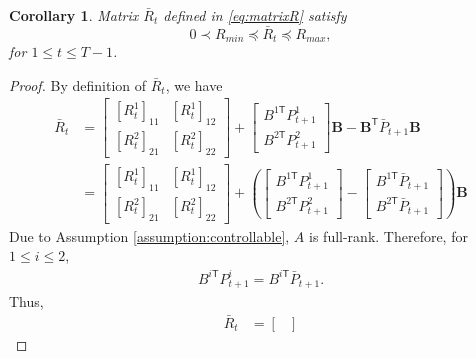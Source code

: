 \documentclass[letterpaper, 10 pt, conference]{ieeeconf}  %
\newcommand{\transpose}{\mathsf{T}}
\newtheorem{corollary}{Corollary}
\begin{document}
\begin{corollary}
    Matrix $\bar{R}_{t}$ defined in \eqref{eq:matrixR} satisfy
    \begin{equation}
        0 \prec R_{min} \preceq \bar{R}_{t} \preceq R_{max},
    \end{equation}
    for $1\leq t \leq T-1$.
\end{corollary}
\begin{proof}
    By definition of $\bar{R}_{t}$, we have
    \begin{align*}
        \bar{R}_{t} &= 
        \begin{bmatrix}
            [R_{t}^{1}]_{11} & [R_{t}^{1}]_{12}\\
            [R_{t}^{2}]_{21} & [R_{t}^{2}]_{22}
        \end{bmatrix}
        + 
        \begin{bmatrix}
            B^{1\transpose}P_{t+1}^{1}\\
            B^{2\transpose}P_{t+1}^{2}
        \end{bmatrix}\mathbf{B}
        - \mathbf{B}^{\transpose}\bar{P}_{t+1}\mathbf{B}\\
        &= \begin{bmatrix}
            [R_{t}^{1}]_{11} & [R_{t}^{1}]_{12}\\
            [R_{t}^{2}]_{21} & [R_{t}^{2}]_{22}
        \end{bmatrix}
        + 
        (\begin{bmatrix}
            B^{1\transpose}P_{t+1}^{1}\\
            B^{2\transpose}P_{t+1}^{2}
        \end{bmatrix}-
        \begin{bmatrix}
            B^{1\transpose}\bar{P}_{t+1}\\
            B^{2\transpose}\bar{P}_{t+1}
        \end{bmatrix}
        )\mathbf{B}
    \end{align*}
    Due to Assumption \ref{assumption:controllable}, $A$ is full-rank. Therefore, for $1\leq i \leq 2$,
    \begin{align*}
        B^{i\transpose}P_{t+1}^{i} = B^{i\transpose}\bar{P}_{t+1}.
    \end{align*}
    Thus,
    \begin{align*}
        \bar{R}_{t} &= 
        \begin{bmatrix}

\end{bmatrix}
\end{align*}
\end{proof}
\end{document}
